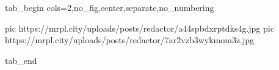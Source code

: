  
 
 
 
 

\ifcmt
  tab_begin cols=2,no_fig,center,separate,no_numbering

     pic https://mrpl.city/uploads/posts/redactor/a44spbdxrptdks4g.jpg
     pic https://mrpl.city/uploads/posts/redactor/7ar2vzb3wykmom3z.jpg

  tab_end
\fi
